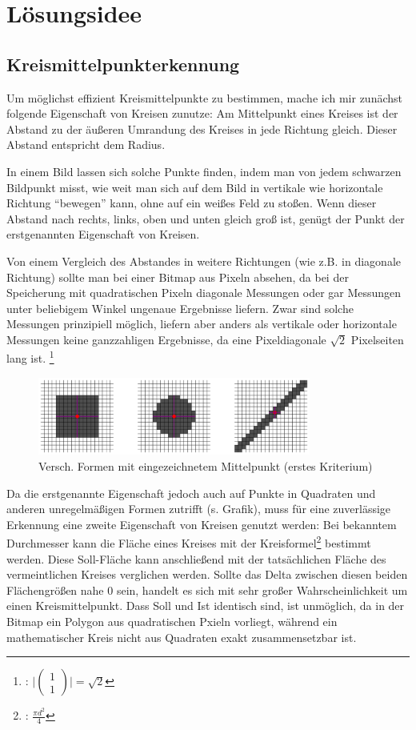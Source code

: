 \section{Lösungsidee}
\subsection{Kreismittelpunkterkennung}
Um möglichst effizient Kreismittelpunkte zu bestimmen, mache ich mir zunächst folgende Eigenschaft von Kreisen zunutze: Am Mittelpunkt eines Kreises ist der Abstand zu der äußeren Umrandung des Kreises in jede Richtung gleich. Dieser Abstand entspricht dem Radius.

In einem Bild lassen sich solche Punkte finden, indem man von jedem schwarzen Bildpunkt misst, wie weit man sich auf dem Bild in vertikale wie horizontale Richtung "`bewegen"' kann, ohne auf ein weißes Feld zu stoßen. Wenn dieser Abstand nach rechts, links, oben und unten gleich groß ist, genügt der Punkt der erstgenannten Eigenschaft von Kreisen. 

Von einem Vergleich des Abstandes in weitere Richtungen (wie z.B. in diagonale Richtung) sollte man bei einer Bitmap aus Pixeln absehen, da bei der Speicherung mit quadratischen Pixeln diagonale Messungen oder gar Messungen unter beliebigem Winkel ungenaue Ergebnisse liefern. Zwar sind solche Messungen prinzipiell möglich, liefern aber anders als vertikale oder horizontale Messungen keine ganzzahligen Ergebnisse, da eine Pixeldiagonale \(\sqrt{2}\) Pixelseiten lang ist.
\footnote{: \( \vert \begin{pmatrix}1\\1\end{pmatrix} \vert = \sqrt{2}\)}

\begin{figure}[!ht]
	\centering	
	\includegraphics[width=0.8\textwidth]{Grafiken/durchmesservergleich}
	\caption{Versch. Formen mit eingezeichnetem Mittelpunkt (erstes Kriterium)}
\end{figure}

Da die erstgenannte Eigenschaft jedoch auch auf Punkte in Quadraten und anderen unregelmäßigen Formen zutrifft (s. Grafik), muss für eine zuverlässige Erkennung eine zweite Eigenschaft von Kreisen genutzt werden: Bei bekanntem Durchmesser kann die Fläche eines Kreises mit der Kreisformel\footnote{: \(\frac{\pi d^2}{4}\)} bestimmt werden. Diese Soll-Fläche kann anschließend mit der tatsächlichen Fläche des vermeintlichen Kreises verglichen werden. Sollte das Delta zwischen diesen beiden Flächengrößen nahe 0 sein, handelt es sich mit sehr großer Wahrscheinlichkeit um einen Kreismittelpunkt. Dass Soll und Ist identisch sind, ist unmöglich, da in der Bitmap ein Polygon aus quadratischen Pxieln vorliegt, während ein mathematischer Kreis nicht aus Quadraten exakt zusammensetzbar ist.

